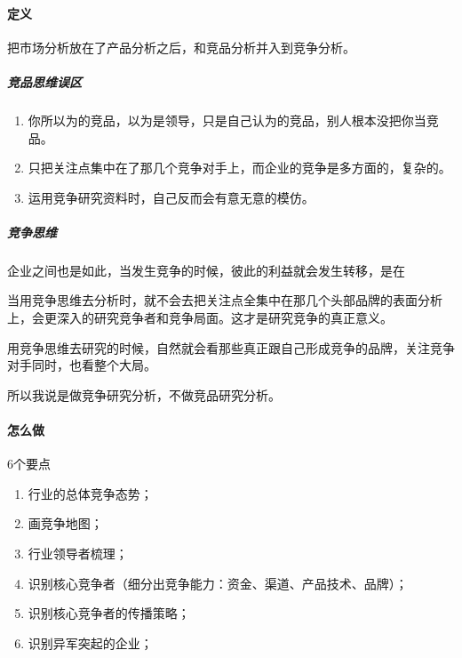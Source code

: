 \documentclass[letterpaper,11pt,english]{sphinxmanual}
\begin{document}
\paragraph{定义}
\label{\detokenize{chapter_knowledge/compete_analysis:id2}}
把市场分析放在了产品分析之后，和竞品分析并入到竞争分析。


\subparagraph{竞品思维误区}
\label{\detokenize{chapter_knowledge/compete_analysis:id3}}\begin{enumerate}
%
\item {} 
你所以为的竞品，以为是领导，只是自己认为的竞品，别人根本没把你当竞品。

\item {} 
只把关注点集中在了那几个竞争对手上，而企业的竞争是多方面的，复杂的。

\item {} 
运用竞争研究资料时，自己反而会有意无意的模仿。

\end{enumerate}


\subparagraph{竞争思维}
\label{\detokenize{chapter_knowledge/compete_analysis:id4}}
企业之间也是如此，当发生竞争的时候，彼此的利益就会发生转移，是在

当用竞争思维去分析时，就不会去把关注点全集中在那几个头部品牌的表面分析上，会更深入的研究竞争者和竞争局面。这才是研究竞争的真正意义。

用竞争思维去研究的时候，自然就会看那些真正跟自己形成竞争的品牌，关注竞争对手同时，也看整个大局。

所以我说是做竞争研究分析，不做竞品研究分析。%
\begin{footnote}[476]\sphinxAtStartFootnote
{}
%
\end{footnote}


\paragraph{怎么做}
\label{\detokenize{chapter_knowledge/compete_analysis:id5}}
6个要点
\begin{enumerate}
%
\item {} 
行业的总体竞争态势；

\item {} 
画竞争地图；

\item {} 
行业领导者梳理；

\item {} 
识别核心竞争者（细分出竞争能力：资金、渠道、产品技术、品牌）；

\item {} 
识别核心竞争者的传播策略；

\item {} 
识别异军突起的企业；

\end{enumerate}
\end{document}
